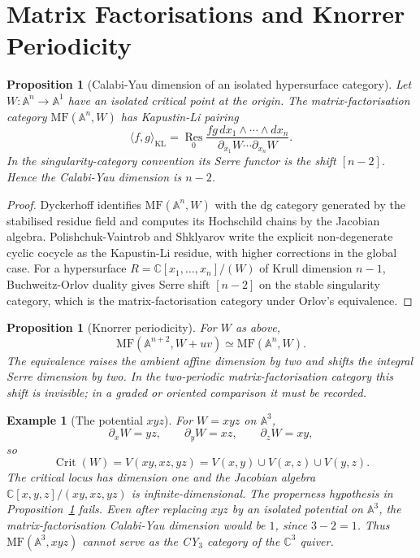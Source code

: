 \documentclass[11pt]{amsart}
\newtheorem{proposition}[theorem]{Proposition}
\newtheorem{example}[theorem]{Example}
\newcommand{\MF}{\mathrm{MF}}
\newcommand{\bA}{\mathbb{A}}
\newcommand{\bC}{\mathbb{C}}
\begin{document}
\section{Matrix Factorisations and Knorrer Periodicity}

\begin{proposition}[Calabi-Yau dimension of an isolated hypersurface category]
\label{prop:mf-dimension}
Let $W\colon\bA^n\to\bA^1$ have an isolated critical point at the origin.
The matrix-factorisation category $\MF(\bA^n,W)$ has Kapustin-Li
pairing
\[
  \langle f,g\rangle_{\mathrm{KL}}
  =
  \operatorname*{Res}_{0}
  \frac{fg\,dx_1\wedge\cdots\wedge dx_n}
       {\partial_{x_1}W\cdots\partial_{x_n}W}.
\]
In the singularity-category convention its Serre functor is the shift
$[n-2]$.  Hence the Calabi-Yau dimension is $n-2$.
\end{proposition}

\begin{proof}
Dyckerhoff identifies $\MF(\bA^n,W)$ with the dg category generated by
the stabilised residue field and computes its Hochschild chains by the
Jacobian algebra.  Polishchuk-Vaintrob and Shklyarov write the explicit
non-degenerate cyclic cocycle as the Kapustin-Li residue, with higher
corrections in the global case.  For a hypersurface
$R=\bC[x_1,\ldots,x_n]/(W)$ of Krull dimension $n-1$, Buchweitz-Orlov
duality gives Serre shift $[n-2]$ on the stable singularity category,
which is the matrix-factorisation category under Orlov's equivalence.
\end{proof}

\begin{proposition}[Knorrer periodicity]
\label{prop:knorrer}
For $W$ as above,
\[
  \MF(\bA^{n+2},W+uv)\simeq\MF(\bA^n,W).
\]
The equivalence raises the ambient affine dimension by two and shifts
the integral Serre dimension by two.  In the two-periodic
matrix-factorisation category this shift is invisible; in a graded or
oriented comparison it must be recorded.
\end{proposition}

\begin{example}[The potential $xyz$]
For $W=xyz$ on $\bA^3$,
\[
  \partial_xW=yz,\qquad \partial_yW=xz,\qquad \partial_zW=xy,
\]
so
\[
  \operatorname{Crit}(W)=V(xy,xz,yz)
  =
  V(x,y)\cup V(x,z)\cup V(y,z).
\]
The critical locus has dimension one and the Jacobian algebra
$\bC[x,y,z]/(xy,xz,yz)$ is infinite-dimensional.  The properness
hypothesis in Proposition~\ref{prop:mf-dimension} fails.  Even after
replacing $xyz$ by an isolated potential on $\bA^3$, the
matrix-factorisation Calabi-Yau dimension would be $1$, since
$3-2=1$.  Thus $\MF(\bA^3,xyz)$ cannot serve as the CY$_3$ category of
the $\bC^3$ quiver.
\end{example}
\end{document}
